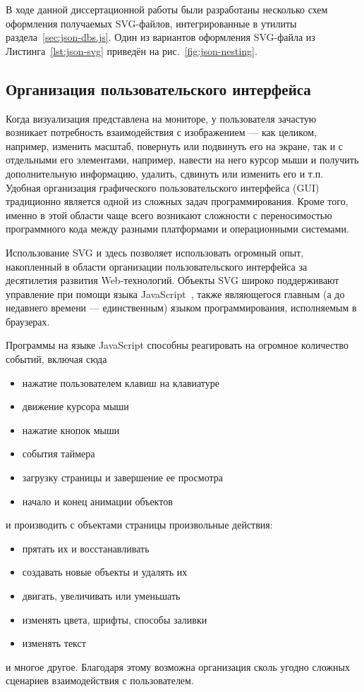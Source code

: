 В ходе данной диссертационной работы
были разработаны несколько схем
оформления получаемых SVG-файлов,
интегрированные в утилиты раздела~\ref{sec:json-dbs.js}.
Один из вариантов оформления
SVG-файла из Листинга~\ref{lst:json-svg}
приведён на рис.~\ref{fig:json-nesting}.

\subsection{Организация пользовательского интерфейса}

Когда визуализация представлена на мониторе,
у пользователя зачастую возникает потребность
взаимодействия с изображением ---
как целиком,
например, изменить масштаб,
повернуть или подвинуть его на экране,
так и с отдельными его элементами,
например, навести на него курсор мыши
и получить дополнительную информацию,
удалить, сдвинуть или изменить его
и т.п.
Удобная организация графического
пользовательского интерфейса
(GUI)
традиционно является одной из сложных
задач программирования.
Кроме того,
именно в этой области
чаще всего возникают сложности
с переносимостью программного кода
между разными платформами и операционными системами.

Использование SVG
и здесь позволяет использовать
огромный опыт,
накопленный в области организации пользовательского интерфейса
за десятилетия развития Web-технологий.
Объекты SVG
широко поддерживают управление при помощи языка
JavaScript~\cite{bi:JavaScript},
также являющегося главным
(а до недавнего времени --- единственным)
языком программирования,
исполняемым в браузерах.

Программы на языке JavaScript
способны реагировать на огромное количество событий,
включая сюда
\begin{itemize}
  \item нажатие пользователем клавиш на клавиатуре
  \item движение курсора мыши
  \item нажатие кнопок мыши
  \item события таймера
  \item загрузку страницы и завершение ее просмотра
  \item начало и конец анимации объектов
\end{itemize}
и производить с объектами страницы произвольные действия:
\begin{itemize}
  \item прятать их и восстанавливать
  \item создавать новые объекты и удалять их
  \item двигать, увеличивать или уменьшать
  \item изменять цвета, шрифты, способы заливки
  \item изменять текст
\end{itemize}
и многое другое.
Благодаря этому возможна организация сколь угодно
сложных сценариев взаимодействия с пользователем.

